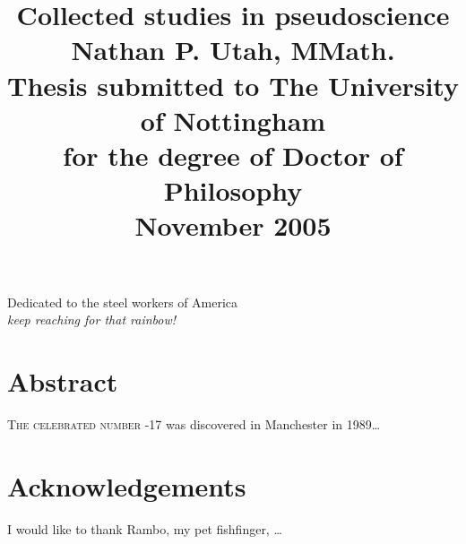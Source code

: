 \documentclass[11pt,a4paper]{report}
\numberwithin{equation}{section}
\begin{document}
	
	\title{
		\huge{\textbf{Collected studies in pseudoscience}} \\[1.2cm]
		\Large{	Nathan P. Utah, MMath.} \\[1.2cm]
		\Large{Thesis submitted to The University of Nottingham \\ for
		the degree of Doctor of Philosophy} \\ \vspace{1cm}
		\Large{November 2005} 
	} 
	\author{} \date{}
	\maketitle
	
 	\newpage \vspace*{8cm} 
	\begin{center} 
		\large Dedicated to the steel workers of America \\
		\emph{keep reaching for that rainbow!}
 	\end{center}

	\newpage 
	\chapter*{Abstract}
	\textsc{The celebrated number} -17 was discovered in Manchester
	in 1989\dots 

 	\chapter*{Acknowledgements}
	I would like to thank Rambo, my pet fishfinger, \dots
	
	\tableofcontents 
	\newpage	
 	
	
	
	
\end{document}
